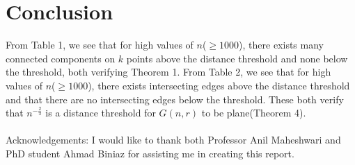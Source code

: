 \documentclass{article}
\newcommand{\dg}{G(n,r)}
\begin{document}
\section{Conclusion}
From Table 1, we see that for high values of $n$($\geq 1000$), there exists many connected components on $k$ points above the distance threshold
and none below the threshold, both verifying Theorem 1. From Table 2, we see that for high values of $n$($\geq 1000$), there exists intersecting edges above the distance threshold and that there are no intersecting edges below the threshold. These both verify that $n^{-\frac{2}{3}}$ is a distance threshold for $\dg$ to be plane(Theorem 4).
\\
\\
Acknowledgements: I would like to thank both Professor Anil Maheshwari and PhD student Ahmad Biniaz for assisting me in creating this report.



\end{document}
